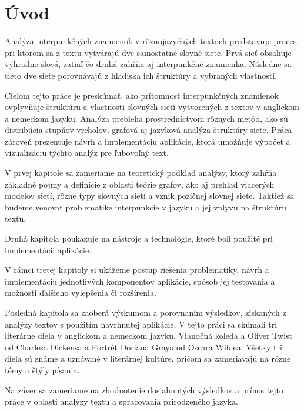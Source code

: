 \chapter*{Úvod}

Analýza interpunkčných znamienok v rôznojazyčných textoch predstavuje proces, pri ktorom sa z textu vytvárajú dve samostatné slovné siete.
Prvá sieť obsahuje výhradne slová, zatiaľ čo druhá zahŕňa aj interpunkčné znamienka.
Následne sa tieto dve siete porovnávajú z hľadiska ich štruktúry a vybraných vlastností.

Cieľom tejto práce je preskúmať, ako prítomnosť interpunkčných znamienok ovplyvňuje štruktúru a vlastnosti slovných sietí vytvorených
z textov v anglickom a nemeckom jazyku. Analýza prebieha prostredníctvom rôznych metód, ako sú distribúcia stupňov vrcholov,
grafová aj jazyková analýza štruktúry siete. Práca zároveň prezentuje návrh a implementáciu aplikácie, ktorá umožňuje
výpočet a vizualizáciu týchto analýz pre ľubovoľný text.

V prvej kapitole sa zameriame na teoretický podklad analýzy, ktorý zahŕňa základné pojmy a definície z oblasti teórie grafov,
ako aj prehľad viacerých modelov sietí, rôzne typy slovných sietí a vznik pozičnej slovnej siete. Taktiež sa budeme venovať problematike interpunkcie
v jazyku a jej vplyvu na štruktúru textu.

Druhá kapitola poukazuje na nástroje a technológie, ktoré boli použité pri implementácii aplikácie.

V rámci tretej kapitoly si ukážeme postup riešenia problematiky, návrh a implementáciu jednotlivých komponentov aplikácie,
spôsob jej testovania a možnosti ďalšieho vylepšenia či rozšírenia.

Posledná kapitola sa zaoberá výskumom a porovnaním výsledkov, získaných z analýzy textov s použitím navrhnutej aplikácie.
V tejto práci sa skúmali tri literárne diela v anglickom a nemeckom jazyku, Vianočná koleda a Oliver Twist od Charlesa Dickensa a
Portrét Doriana Graya od Oscara Wildea. Všetky tri diela sú známe a uznávané v literárnej kultúre, pričom sa zameriavajú na rôzne témy a štýly písania.

Na záver sa zameriame na zhodnotenie dosiahnutých výsledkov a prínos tejto práce v oblasti analýzy textu a spracovania prirodzeného jazyka.